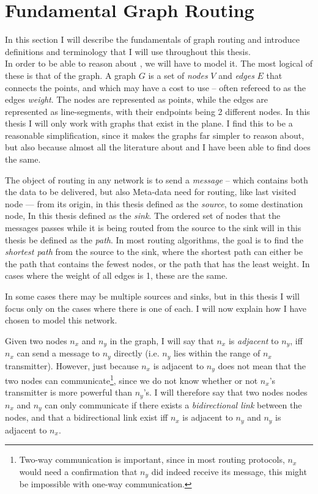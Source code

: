 \section{Fundamental Graph Routing}
\label{fundamental}
In this section I will describe the fundamentals of graph routing and introduce definitions and terminology that I will use throughout this thesis.\\

In order to be able to reason about \manet, we will have to model it. The most logical of these is that of the graph. A graph $G$ is a set of \emph{nodes} $V$ and \emph{edges} $E$ that connects the points, and which may have a cost to use -- often refereed to as the edges \emph{weight}. The nodes are represented as points, while the edges are represented as line-segments, with their endpoints being 2 different nodes. In this thesis I will only work with graphs that exist in the plane. I find this to be a reasonable simplification, since it makes the graphs far simpler to reason about, but also because almost all the literature about \manet and \anet I have been able to find does the same. 

The object of routing in any network is to send a \emph{message} -- which contains both the data to be delivered, but also Meta-data need for routing, like last visited node --- from its origin, in this thesis defined as the \emph{source}, to some destination node, In this thesis defined as the \emph{sink}. The ordered set of nodes that the messages passes while it is being routed from the source to the sink will in this thesis be defined as the \emph{path}. In most routing algorithms, the goal is to find the \emph{shortest path} from the source to the sink, where the shortest path can either be the path that contains the fewest nodes, or the path that has the least weight. In cases where the weight of all edges is 1, these are the same. 

In some cases there may be multiple sources and sinks, but in this thesis I will focus only on the cases where there is one of each. I will now explain how I have chosen to model this network. 

Given two nodes $n_x$ and $n_y$ in the graph, I will say that $n_x$ is \emph{adjacent} to $n_y$, iff $n_x$ can send a message to $n_y$ directly (i.e. $n_y$ lies within the range of $n_x$ transmitter). However, just because $n_x$ is adjacent to $n_y$ does not mean that the two nodes can communicate\footnote{Two-way communication is important, since in most routing protocols, $n_x$ would need a confirmation that $n_y$ did indeed receive its message, this might be impossible with one-way communication.}, since we do not know whether or not $n_x$'s transmitter is more powerful than $n_y$'s. I will therefore say that two nodes nodes $n_x$ and $n_y$ can only communicate if there exists a \emph{bidirectional link} between the nodes, and that a bidirectional link exist iff $n_x$ is adjacent to $n_y$ and $n_y$ is adjacent to $n_x$.


